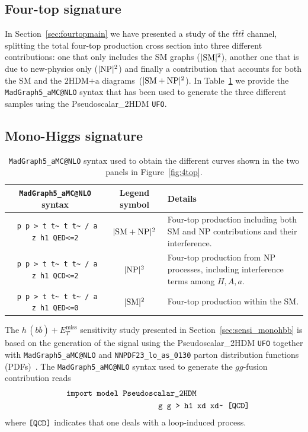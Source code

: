 \documentclass[review]{elsarticle}
\newcommand{\MET}{\ensuremath{E_T^\mathrm{miss}}\xspace}
\newcommand{\hdma}{\ensuremath{\textrm{2HDM+a}}\xspace}
\begin{document}
\subsection{Four-top signature}

In Section~\ref{sec:fourtopmain} we have presented a study of the $t \bar t t \bar t$ channel, splitting the  total four-top production cross section into three different contributions: one that only includes the SM graphs ($|{\rm SM}|^2$), another one that is due to new-physics only ($|{\rm NP}|^2$) and finally a contribution that accounts for both the SM and the \hdma diagrams~($|{\rm SM} + {\rm NP}|^2$). In Table~\ref{tab-dmhf-4tops} we provide the {\tt MadGraph5\_aMC@NLO} syntax that has been used to generate the three different samples using the Pseudoscalar\_2HDM {\tt UFO}. 

\subsection{Mono-Higgs signature}

\begin{table}[t!]
\begin{tabular}{ccm{50mm}}
\toprule
 {\tt MadGraph5\_aMC@NLO} syntax & Legend symbol & Details \\\midrule
\verb| p p > t t~ t t~ / a z h1 QED<=2|& $|{\rm SM}+{\rm NP}|^2$ & Four-top
production including both SM and NP contributions and their
interference. \\\midrule
\verb| p p > t t~ t t~ / a z h1 QCD<=2|& $|{\rm NP}|^2$ & Four-top
production from NP processes, including interference terms among
$H,A,a$. \\\midrule
\verb| p p > t t~ t t~ / a z h1 QED<=0|& $|{\rm SM}|^2$ & Four-top 
production within the SM.\\
\bottomrule
\end{tabular}
\vspace{4mm} 
\caption{{\tt MadGraph5\_aMC@NLO} syntax used to obtain the different curves shown in the two panels in Figure~\ref{fig:4top}.}
\label{tab-dmhf-4tops}
\end{table}

The $h \, (b \bar b) + \MET$ sensitivity study presented in Section~\ref{sec:sensi_monohbb} is based on the generation of the signal using the Pseudoscalar\_2HDM {\tt UFO} together with {\tt MadGraph5\_aMC@NLO} and {\tt NNPDF23\_lo\_as\_0130} parton distribution functions (PDFs)~\cite{Ball:2012cx}. The {\tt MadGraph5\_aMC@NLO}  syntax used to generate the $gg$-fusion contribution reads 
\begin{eqnarray}
&& \verb| import model Pseudoscalar_2HDM | \hspace{2.25cm} \nonumber \\
&& \verb| g g > h1 xd xd~ [QCD] | \nonumber 
\end{eqnarray}
where  $\verb|[QCD]|$ indicates that one deals with a loop-induced process. 
\end{document}
